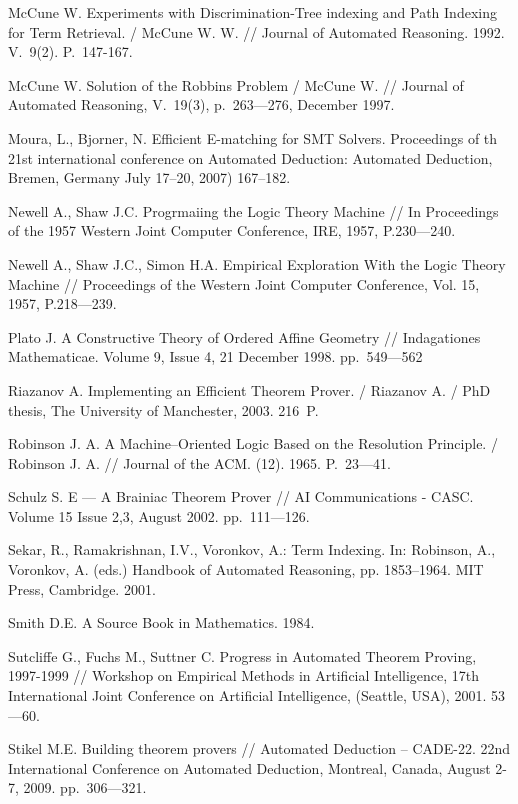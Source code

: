 \begin{thebibliography}{99}
 McCune W. Experiments with Discrimination-Tree indexing and Path Indexing for Term Retrieval. / McCune W. W. // Journal of Automated Reasoning. 1992. V.~9(2). P.~147-167.

 McCune W. Solution of the Robbins Problem / McCune W. // Journal of Automated Reasoning, V.~19(3), p.~263---276, December 1997.

 Moura, L., Bjorner, N. Efficient E-matching for SMT Solvers. Proceedings of th 21st international conference on Automated Deduction: Automated Deduction, Bremen, Germany July 17--20, 2007) 167--182.

 Newell A., Shaw J.C. Progrmaiing the Logic Theory Machine // In Proceedings of the 1957 Western Joint Computer Conference, IRE, 1957, P.230---240.

 Newell A., Shaw J.C., Simon H.A. Empirical Exploration With the Logic Theory Machine // Proceedings of the Western Joint Computer Conference, Vol. 15, 1957, P.218---239.

 Plato J. A Constructive Theory of Ordered Affine Geometry // Indagationes Mathematicae. Volume 9, Issue 4, 21 December 1998. pp.~549---562

 Riazanov A. Implementing an Efficient Theorem Prover. / Riazanov A. /  PhD thesis, The University of Manchester, 2003. 216~P.

 Robinson J. A. A Machine--Oriented Logic Based on the Resolution Principle. / Robinson J. A. //  Journal of the ACM. (12). 1965. P.~23---41.

 Schulz S. E --- A Brainiac Theorem Prover // AI Communications - CASC. Volume 15 Issue 2,3, August 2002. pp.~111---126.

 Sekar, R., Ramakrishnan, I.V., Voronkov, A.: Term Indexing. In: Robinson, A., Voronkov, A. (eds.) Handbook of Automated Reasoning, pp. 1853--1964. MIT Press, Cambridge. 2001.

 Smith D.E. A Source Book in Mathematics. 1984.

 Sutcliffe G., Fuchs M., Suttner C. Progress in Automated Theorem Proving, 1997-1999 // Workshop on Empirical Methods in Artificial Intelligence, 17th International Joint Conference on Artificial Intelligence, (Seattle, USA), 2001. 53---60.

 Stikel M.E. Building theorem provers // Automated Deduction – CADE-22. 22nd International Conference on Automated Deduction, Montreal, Canada, August 2-7, 2009. pp.~306---321. 


\end{thebibliography}
